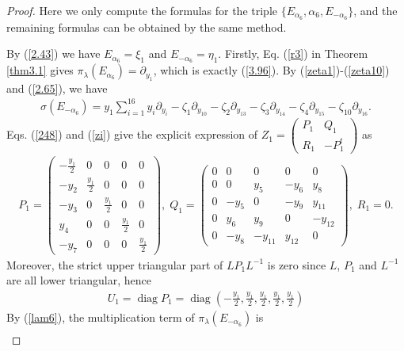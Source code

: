 \documentclass[12pt]{article}
\numberwithin{equation}{section}
\theoremstyle{definition}
\theoremstyle{remark}
\begin{document}
	\begin{proof}
		Here we only compute the formulas for the triple $\{E_{\alpha_6},\alpha_6,E_{-\alpha_6}\}$, and the remaining formulas can be obtained by the same method.
		
		By (\ref{2.43}) we have $E_{\alpha_6}=\xi_1$ and $E_{-\alpha_6}=\eta_1$. Firstly, Eq. (\ref{r3}) in Theorem \ref{thm3.1} gives $\pi_{\lambda}(E_{\alpha_6})=\partial_{y_1}$, which is exactly (\ref{3.96}). 
		By (\ref{zeta1})-(\ref{zeta10}) and (\ref{2.65}), we have
		\begin{eqnarray}
			\sigma(E_{-\alpha_6})=y_1\mathop{\textstyle\sum}\limits_{i=1}^{16}y_i\partial_{y_{i}}-\zeta_1\partial_{y_{10}}-\zeta_2\partial_{y_{13}}-\zeta_3\partial_{y_{14}}-\zeta_4\partial_{y_{15}}-\zeta_{10}\partial_{y_{16}}.\label{e61}
		\end{eqnarray}
		Eqs. (\ref{248}) and (\ref{zi}) give the explicit expression of $Z_1=\begin{pmatrix}
			P_1&Q_1\\R_1&-P_1^t
		\end{pmatrix}$ as
		\begin{eqnarray}
			P_1=\begin{pmatrix}
				-\frac{y_1}{2}&0&0&0&0\\
				-y_2&\frac{y_1}{2}&0&0&0\\
				-y_3&0&\frac{y_1}{2}&0&0\\
				y_4&0&0&\frac{y_1}{2}&0\\
				-y_7&0&0&0&\frac{y_1}{2}
			\end{pmatrix},\;
			Q_1=\begin{pmatrix}
				0&0&0&0&0\\
				0&0&y_5&-y_6&y_8\\
				0&-y_5&0&-y_9&y_{11}\\
				0&y_6&y_9&0&-y_{12}\\
				0&-y_8&-y_{11}&y_{12}&0
			\end{pmatrix},\; R_1=0.\label{PQR1}
		\end{eqnarray}
		Moreover, the strict upper triangular part of $LP_1L^{-1}$ is zero since $L$, $P_1$ and $L^{-1}$ are all lower triangular, hence
		\begin{eqnarray}
			U_1=\operatorname{diag}P_1=\operatorname{diag}(-\frac{y_1}{2},\frac{y_1}{2},\frac{y_1}{2},\frac{y_1}{2},\frac{y_1}{2}) \label{U1}
		\end{eqnarray}
		By (\ref{lam6}), the multiplication term of $\pi_{\lambda}(E_{-\alpha_6})$ is
		\begin{eqnarray}

\end{eqnarray}
\end{proof}
\end{document}
